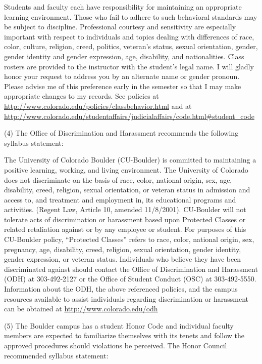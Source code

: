 \documentclass[]{article}
\begin{document}
Students and faculty each have responsibility for maintaining an appropriate
learning environment. Those who fail to adhere to such behavioral standards may
be subject to discipline. Professional courtesy and sensitivity are especially
important with respect to individuals and topics dealing with differences of
race, color, culture, religion, creed, politics, veteran's status, sexual
orientation, gender, gender identity and gender expression, age, disability,
and nationalities.  Class rosters are provided to the instructor with the
student's legal name. I will gladly honor your request to address you by an
alternate name or gender pronoun. Please advise me of this preference early in
the semester so that I may make appropriate changes to my records.  See policies at
\url{http://www.colorado.edu/policies/classbehavior.html}   and at
\url{http://www.colorado.edu/studentaffairs/judicialaffairs/code.html#student_code}



(4)  The Office of Discrimination and Harassment recommends the following
syllabus statement:

The University of Colorado Boulder (CU-Boulder) is committed to maintaining a
positive learning, working, and living environment. The University of Colorado
does not discriminate on the basis of race, color, national origin, sex, age,
disability, creed, religion, sexual orientation, or veteran status in admission
and access to, and treatment and employment in, its educational programs and
activities. (Regent Law, Article 10, amended 11/8/2001).  CU-Boulder will not
tolerate acts of discrimination or harassment based upon Protected Classes or
related retaliation against or by any employee or student. For purposes of this
CU-Boulder policy, “Protected Classes” refers to race, color, national origin,
sex, pregnancy,  age, disability, creed, religion, sexual orientation, gender
identity, gender expression,  or veteran status.  Individuals who believe they
have been discriminated against should contact the Office of Discrimination and
Harassment (ODH) at 303-492-2127 or the Office of Student Conduct (OSC) at
303-492-5550.  Information about the ODH, the above referenced policies, and
the campus resources available to assist individuals regarding discrimination
or harassment can be obtained at \url{http://www.colorado.edu/odh}

(5)  The Boulder campus has a student Honor Code and individual faculty members
are expected to familiarize themselves with its tenets and follow the approved
procedures should violations be perceived.  The Honor Council recommended
syllabus statement:
\end{document}
